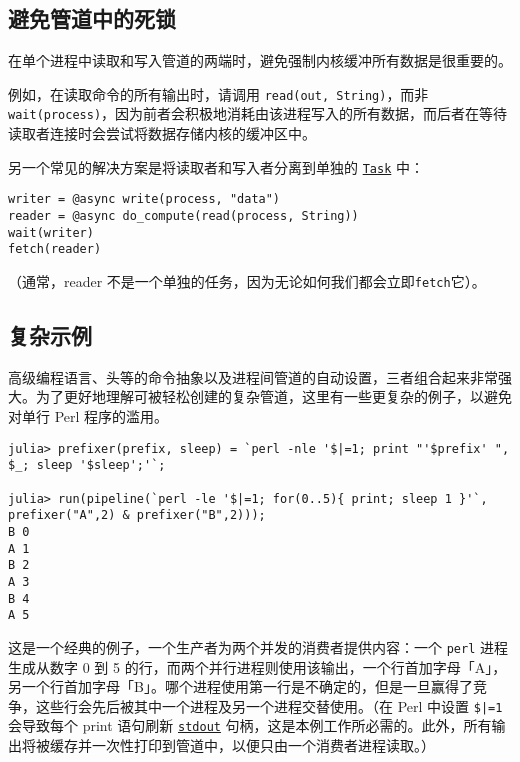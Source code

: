 \hypertarget{10119727931012697003}{}


\subsection{避免管道中的死锁}



在单个进程中读取和写入管道的两端时，避免强制内核缓冲所有数据是很重要的。



例如，在读取命令的所有输出时，请调用 \texttt{read(out, String)}，而非 \texttt{wait(process)}，因为前者会积极地消耗由该进程写入的所有数据，而后者在等待读取者连接时会尝试将数据存储内核的缓冲区中。



另一个常见的解决方案是将读取者和写入者分离到单独的 \hyperlink{7131243650304654155}{\texttt{Task}} 中：




\begin{verbatim}
writer = @async write(process, "data")
reader = @async do_compute(read(process, String))
wait(writer)
fetch(reader)
\end{verbatim}



（通常，reader 不是一个单独的任务，因为无论如何我们都会立即\texttt{fetch}它）。



\hypertarget{14183945833806948978}{}


\subsection{复杂示例}



高级编程语言、头等的命令抽象以及进程间管道的自动设置，三者组合起来非常强大。为了更好地理解可被轻松创建的复杂管道，这里有一些更复杂的例子，以避免对单行 Perl 程序的滥用。




\begin{verbatim}
julia> prefixer(prefix, sleep) = `perl -nle '$|=1; print "'$prefix' ", $_; sleep '$sleep';'`;

julia> run(pipeline(`perl -le '$|=1; for(0..5){ print; sleep 1 }'`, prefixer("A",2) & prefixer("B",2)));
B 0
A 1
B 2
A 3
B 4
A 5
\end{verbatim}



这是一个经典的例子，一个生产者为两个并发的消费者提供内容：一个 \texttt{perl} 进程生成从数字 0 到 5 的行，而两个并行进程则使用该输出，一个行首加字母「A」，另一个行首加字母「B」。哪个进程使用第一行是不确定的，但是一旦赢得了竞争，这些行会先后被其中一个进程及另一个进程交替使用。（在 Perl 中设置 \texttt{\$|=1} 会导致每个 print 语句刷新 \hyperlink{18181294266083891471}{\texttt{stdout}} 句柄，这是本例工作所必需的。此外，所有输出将被缓存并一次性打印到管道中，以便只由一个消费者进程读取。）




